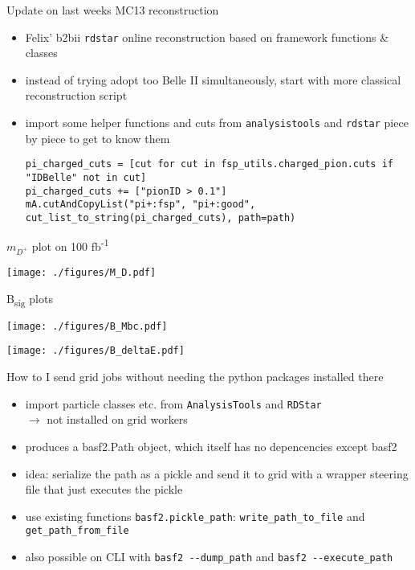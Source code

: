 \documentclass[aspectratio=169, 16pt]{beamer}
\begin{document}
\begin{frame}[label={sec:org956ec8d},fragile]{Update on last weeks MC13 reconstruction}
 \begin{itemize}
\item Felix' b2bii \texttt{rdstar} online reconstruction based on framework functions \& classes
\item instead of trying adopt too Belle II simultaneously, start with more classical
reconstruction script
\item import some helper functions and cuts from \texttt{analysistools} and \texttt{rdstar} piece
by piece to get to know them
\begin{lstlisting}
pi_charged_cuts = [cut for cut in fsp_utils.charged_pion.cuts if "IDBelle" not in cut]
pi_charged_cuts += ["pionID > 0.1"]
mA.cutAndCopyList("pi+:fsp", "pi+:good", cut_list_to_string(pi_charged_cuts), path=path)
\end{lstlisting}
\end{itemize}
\end{frame}
\begin{frame}[label={sec:orgaa9689f}]{\(m_{D^+}\) plot on 100 fb\textsuperscript{-1}}
\begin{center}
\texttt{[image: ./figures/M\_D.pdf]}
\end{center}
\end{frame}
\begin{frame}[label={sec:orgafba358}]{B\textsubscript{sig} plots}
\begin{center}
\texttt{[image: ./figures/B\_Mbc.pdf]}
\end{center}
\begin{center}
\texttt{[image: ./figures/B\_deltaE.pdf]}
\end{center}
\end{frame}
\begin{frame}[label={sec:orgf335e33},fragile]{How to I send grid jobs without needing the python packages installed there}
 \begin{itemize}
\item import particle classes etc. from \texttt{AnalysisTools} and \texttt{RDStar} \\
\(\rightarrow\) not installed on grid workers
\item produces a basf2.Path object, which itself has no depencencies except basf2
\item idea: serialize the path as a pickle and send it to grid with a wrapper
steering file that just executes the pickle
\item use existing functions \texttt{basf2.pickle\_path}: \texttt{write\_path\_to\_file} and \texttt{get\_path\_from\_file}
\item also possible on CLI with \texttt{basf2 -{}-dump\_path} and \texttt{basf2 -{}-execute\_path}
\end{itemize}
\end{frame}
\end{document}
